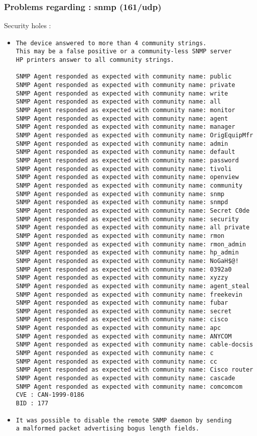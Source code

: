 \documentclass{article}
\begin{document}
\subsubsection{Problems regarding : snmp (161/udp)}
Security holes :\\
\begin{itemize}
\item \begin{verbatim}
The device answered to more than 4 community strings.
This may be a false positive or a community-less SNMP server
HP printers answer to all community strings.

SNMP Agent responded as expected with community name: public
SNMP Agent responded as expected with community name: private
SNMP Agent responded as expected with community name: write
SNMP Agent responded as expected with community name: all
SNMP Agent responded as expected with community name: monitor
SNMP Agent responded as expected with community name: agent
SNMP Agent responded as expected with community name: manager
SNMP Agent responded as expected with community name: OrigEquipMfr
SNMP Agent responded as expected with community name: admin
SNMP Agent responded as expected with community name: default
SNMP Agent responded as expected with community name: password
SNMP Agent responded as expected with community name: tivoli
SNMP Agent responded as expected with community name: openview
SNMP Agent responded as expected with community name: community
SNMP Agent responded as expected with community name: snmp
SNMP Agent responded as expected with community name: snmpd
SNMP Agent responded as expected with community name: Secret C0de
SNMP Agent responded as expected with community name: security
SNMP Agent responded as expected with community name: all private
SNMP Agent responded as expected with community name: rmon
SNMP Agent responded as expected with community name: rmon_admin
SNMP Agent responded as expected with community name: hp_admin
SNMP Agent responded as expected with community name: NoGaH$@!
SNMP Agent responded as expected with community name: 0392a0
SNMP Agent responded as expected with community name: xyzzy
SNMP Agent responded as expected with community name: agent_steal
SNMP Agent responded as expected with community name: freekevin
SNMP Agent responded as expected with community name: fubar
SNMP Agent responded as expected with community name: secret
SNMP Agent responded as expected with community name: cisco
SNMP Agent responded as expected with community name: apc
SNMP Agent responded as expected with community name: ANYCOM
SNMP Agent responded as expected with community name: cable-docsis
SNMP Agent responded as expected with community name: c
SNMP Agent responded as expected with community name: cc
SNMP Agent responded as expected with community name: Cisco router
SNMP Agent responded as expected with community name: cascade
SNMP Agent responded as expected with community name: comcomcom
CVE : CAN-1999-0186
BID : 177
\end{verbatim}\item \begin{verbatim}
It was possible to disable the remote SNMP daemon by sending
a malformed packet advertising bogus length fields.


\end{verbatim}
\end{itemize}
\end{document}

